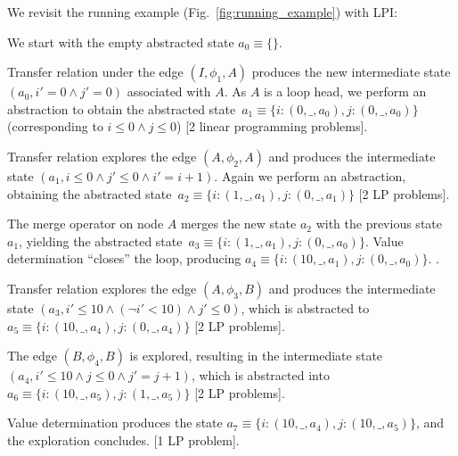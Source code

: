 \documentclass{llncs}
\newcommand{\tuple}[1]{\ensuremath{\left( #1 \right) }}
\begin{document}
\begin{example}
    We revisit the running example (Fig.~\ref{fig:running_example}) with LPI:
    \begin{compactenum}
        \item We start with the empty abstracted state $a_0 \equiv \{\}$.
        \item Transfer relation under the edge $(I, \phi_1, A)$ produces the new
            intermediate state $\tuple{a_0, i' = 0 \land j' = 0}$ associated with $A$.
            As $A$ is a loop head, we perform an abstraction to obtain the
            abstracted
            state~$a_1 \equiv \{ i: \tuple{0, \_, a_0}, j:  \tuple{0, \_, a_0}\}$
            (corresponding to $i \leq 0 \land j \leq 0$) [2 linear programming problems].
        \item Transfer relation explores the edge $(A, \phi_2, A)$ and produces
            the intermediate state $\tuple{a_1, i \leq 0 \land j' \leq 0 \land i' = i + 1}$.
            Again we perform an abstraction, obtaining the abstracted
            state~$a_2 \equiv \{ i: \tuple{1, \_, a_1}, j: \tuple{0, \_, a_1} \}$
             [2 LP problems].
        \item The merge operator on node $A$ merges the new state $a_2$
            with the previous state $a_1$, yielding the abstracted
            state~$a_3 \equiv \{ i: \tuple{1, \_, a_1}, j: \tuple{0, \_, a_0} \}$.
            Value determination ``closes'' the loop, producing
            $a_4 \equiv \{ i: \tuple{10, \_, a_1}, j: \tuple{0, \_, a_0} \}$.
            \newline [1 LP problem].
        \item Transfer relation explores the edge $(A, \phi_3, B)$ and produces
            the intermediate state $\tuple{a_3, i' \leq 10 \land (\lnot i' < 10) \land j' \leq 0}$,
            which is abstracted
            to \newline $a_5 \equiv \{ i: \tuple{10, \_, a_4}, j: \tuple{0, \_, a_4} \}$
            [2 LP problems].
        \item The edge $(B, \phi_4, B)$ is explored, resulting in the
            intermediate state\\ $\tuple{a_4, i' \leq 10 \land j \leq 0 \land j'=j+1}$, which is
            abstracted
            into \newline $a_6 \equiv \{ i: \tuple{10, \_, a_5}, j: \tuple{1, \_, a_5} \}$
            [2 LP problems].
        \item Value determination produces the state
            $a_7 \equiv \{ i: \tuple{10, \_, a_4}, j: \tuple{10, \_, a_5} \}$,
            and the exploration concludes. [1 LP problem].
    \end{compactenum}


\end{example}
\end{document}
